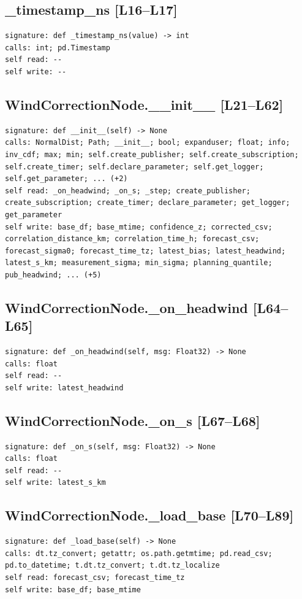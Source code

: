\documentclass[a4paper,10pt,oneside]{book}
\begin{document}
\subsection*{\_timestamp\_ns [L16--L17]}
\begin{lstlisting}[numbers=none]
signature: def _timestamp_ns(value) -> int
calls: int; pd.Timestamp
self read: --
self write: --
\end{lstlisting}
\subsection*{WindCorrectionNode.\_\_init\_\_ [L21--L62]}
\begin{lstlisting}[numbers=none]
signature: def __init__(self) -> None
calls: NormalDist; Path; __init__; bool; expanduser; float; info; inv_cdf; max; min; self.create_publisher; self.create_subscription; self.create_timer; self.declare_parameter; self.get_logger; self.get_parameter; ... (+2)
self read: _on_headwind; _on_s; _step; create_publisher; create_subscription; create_timer; declare_parameter; get_logger; get_parameter
self write: base_df; base_mtime; confidence_z; corrected_csv; correlation_distance_km; correlation_time_h; forecast_csv; forecast_sigma0; forecast_time_tz; latest_bias; latest_headwind; latest_s_km; measurement_sigma; min_sigma; planning_quantile; pub_headwind; ... (+5)
\end{lstlisting}
\subsection*{WindCorrectionNode.\_on\_headwind [L64--L65]}
\begin{lstlisting}[numbers=none]
signature: def _on_headwind(self, msg: Float32) -> None
calls: float
self read: --
self write: latest_headwind
\end{lstlisting}
\subsection*{WindCorrectionNode.\_on\_s [L67--L68]}
\begin{lstlisting}[numbers=none]
signature: def _on_s(self, msg: Float32) -> None
calls: float
self read: --
self write: latest_s_km
\end{lstlisting}
\subsection*{WindCorrectionNode.\_load\_base [L70--L89]}
\begin{lstlisting}[numbers=none]
signature: def _load_base(self) -> None
calls: dt.tz_convert; getattr; os.path.getmtime; pd.read_csv; pd.to_datetime; t.dt.tz_convert; t.dt.tz_localize
self read: forecast_csv; forecast_time_tz
self write: base_df; base_mtime
\end{lstlisting}
\end{document}
